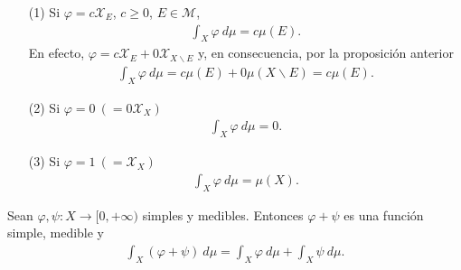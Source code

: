 \begin{obs}
    \begin{enumerate}
        \item[(1)] Si $\varphi = c \mathcal{X}_E$, $c \ge 0$, $E \in \mathcal{M}$,
              \begin{align*}
                  \int_{X}{\varphi \ d\mu} = c\mu(E).
              \end{align*}
              En efecto, $\varphi = c \mathcal{X}_E + 0 \mathcal{X}_{X \backslash E}$ y, en consecuencia, por la proposición anterior
              \begin{align*}
                  \int_{X}{\varphi \ d\mu} = c\mu(E) + 0\mu(X \backslash E) = c\mu(E).
              \end{align*}
        \item[(2)] Si $\varphi = 0 \ (= 0 \mathcal{X}_X)$
              \begin{align*}
                  \int_{X}{\varphi \ d\mu} = 0.
              \end{align*}
        \item[(3)] Si $\varphi = 1 \ (= \mathcal{X}_X)$
              \begin{align*}
                  \int_{X}{\varphi \ d\mu} = \mu(X).
              \end{align*}
    \end{enumerate}
\end{obs}
\begin{prop}
    Sean $\varphi, \psi : X \longrightarrow [0,+\infty)$ simples y medibles. Entonces $\varphi + \psi$ es una función simple, medible y
    \begin{align*}
        \int_{X}{(\varphi + \psi) \ d\mu} = \int_{X}{\varphi \ d\mu} + \int_{X}{\psi \ d\mu}.
    \end{align*}
\end{prop}

